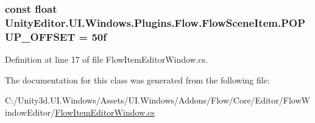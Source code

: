 \subsubsection[{P\+O\+P\+U\+P\+\_\+\+O\+F\+F\+S\+E\+T}]{\setlength{\rightskip}{0pt plus 5cm}const float Unity\+Editor.\+U\+I.\+Windows.\+Plugins.\+Flow.\+Flow\+Scene\+Item.\+P\+O\+P\+U\+P\+\_\+\+O\+F\+F\+S\+E\+T = 50f}\label{class_unity_editor_1_1_u_i_1_1_windows_1_1_plugins_1_1_flow_1_1_flow_scene_item_accd612d28da113e147453fbe170fbb5f}


Definition at line 17 of file Flow\+Item\+Editor\+Window.\+cs.



The documentation for this class was generated from the following file\+:\begin{DoxyCompactItemize}
\item 
C\+:/\+Unity3d.\+U\+I.\+Windows/\+Assets/\+U\+I.\+Windows/\+Addons/\+Flow/\+Core/\+Editor/\+Flow\+Window\+Editor/\hyperlink{_flow_item_editor_window_8cs}{Flow\+Item\+Editor\+Window.\+cs}\end{DoxyCompactItemize}
